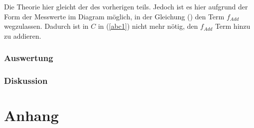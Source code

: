 \documentclass[11pt,a4paper]{article}
\begin{document}
Die Theorie hier gleicht der des vorherigen teils. Jedoch ist es hier aufgrund der Form der Messwerte im Diagram m\"oglich, in der Gleichung (\label{bigint1}) den Term $f_{Add}$ wegzulassen. Dadurch ist in $C$ in (\ref{abc1}) nicht mehr n\"otig, den $f_{Add}$ Term hinzu zu addieren.

\subsubsection{Auswertung}



\subsubsection{Diskussion}


\section{Anhang}
\end{document}
